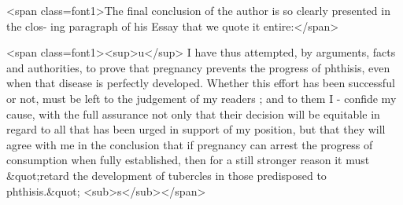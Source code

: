 <span class=font1>The final conclusion of the author is so clearly presented in the clos-
ing paragraph of his Essay that we quote it entire:</span>

<span class=font1><sup>u</sup> I have thus attempted, by arguments, facts and authorities, to
prove that pregnancy prevents the progress of phthisis, even when that
disease is perfectly developed. Whether this effort has been successful
or not, must be left to the judgement of my readers ; and to them I
- confide my cause, with the full assurance not only that their decision
will be equitable in regard to all that has been urged in support of my
position, but that they will agree with me in the conclusion that if
pregnancy can arrest the progress of consumption when fully established,
then for a still stronger reason it must &quot;retard the development of
tubercles in those predisposed to phthisis.&quot; <sub>s</sub></span>\endinput
